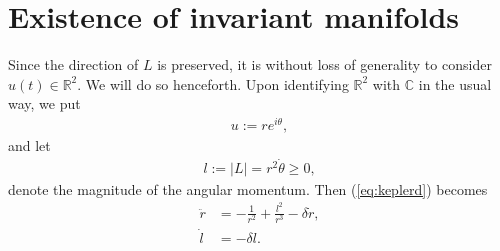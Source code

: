 \documentclass[reqno,12pt]{amsart}
\newcommand{\seclab}[1]{\label{sec:#1}}
\newcommand{\eqlab}[1]{\label{eq:#1}}
\renewcommand{\eqref}[1]{(\ref{eq:#1})}
\numberwithin{equation}{section}
\begin{document}
\section{Existence of invariant manifolds}\seclab{existence}
Since the direction of $L$ is preserved, it is without loss of generality to consider $u(t)\in \mathbb R^2$. We will do so henceforth. 
Upon identifying $\mathbb R^2$ with $\mathbb C$ in the usual way, we put 
\begin{align}
u:=re^{i\theta},\eqlab{ueqn}
\end{align}
and let  
\begin{align}\eqlab{leqn}
l:=\vert L\vert =r^2\dot \theta\ge 0,
\end{align}
denote the magnitude of the angular momentum. Then \eqref{keplerd} becomes
\begin{equation}\eqlab{rttlt}
\begin{aligned}
 \ddot r &=-\frac{1}{r^2}+\frac{l^2}{r^3}-\delta \dot r,\\
 \dot l&=-\delta l.
\end{aligned}
\end{equation}
\end{document}
